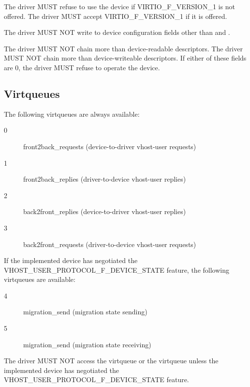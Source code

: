 The driver MUST refuse to use the device if VIRTIO_F_VERSION_1 is
not offered. The driver MUST accept VIRTIO_F_VERSION_1 if it is
offered.

The driver MUST NOT write to device configuration fields other
than  and .

The driver MUST NOT chain more than
 device-readable descriptors.
The driver MUST NOT chain more than
 device-writeable descriptors.
If either of these fields are 0, the driver MUST refuse to
operate the device.

\subsection{Virtqueues}\label{sec:Device Types / Vhost-Guest Device / Virtqueues}

The following virtqueues are always available:

\begin{description}
\item[0] front2back_requests (device-to-driver vhost-user requests)
\item[1] front2back_replies (driver-to-device vhost-user replies)
\item[2] back2front_replies (device-to-driver vhost-user replies)
\item[3] back2front_requests (driver-to-device vhost-user requests)
\end{description}

If the implemented device has negotiated the
VHOST_USER_PROTOCOL_F_DEVICE_STATE feature, the following
virtqueues are available:

\begin{description}
\item[4] migration_send (migration state sending)
\item[5] migration_send (migration state receiving)
\end{description}


The driver MUST NOT access the  virtqueue or
the  virtqueue unless the implemented
device has negotiated the VHOST_USER_PROTOCOL_F_DEVICE_STATE
feature.

